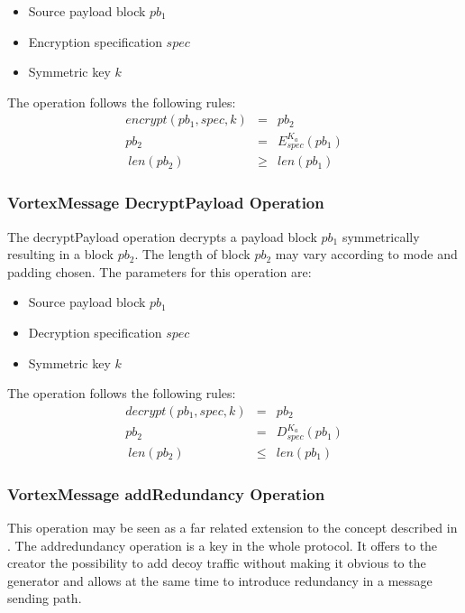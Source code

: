 \begin{itemize}
	\item Source payload block $pb_1$
	\item Encryption specification $spec$
	\item Symmetric key $k$
\end{itemize}

The operation follows the following rules:
\begin{eqnarray}
encrypt(pb_1, spec, k) & = & pb_2 \\
pb_2 & = & E_{spec}^{K_a}\left( pb_1 \right)\\\
len(pb_2) & \geq & len(pb_1)
\end{eqnarray}

\subsubsection{VortexMessage DecryptPayload Operation}
The decryptPayload operation decrypts a payload block $pb_1$ symmetrically resulting in a block $pb_2$. The length of block $pb_2$ may vary according to mode and padding chosen. The parameters for this operation are:

\begin{itemize}
	\item Source payload block $pb_1$
	\item Decryption specification $spec$
	\item Symmetric key $k$
\end{itemize}

The operation follows the following rules:
\begin{eqnarray}
decrypt(pb_1, spec, k) & = & pb_2 \\
pb_2 & = & D_{spec}^{K_a}\left( pb_1 \right)\\\
len(pb_2) & \leq & len(pb_1)
\end{eqnarray}

\subsubsection{VortexMessage addRedundancy Operation}
This operation may be seen as a far related extension to the concept described in \cite{chaum1988multiparty}. The addredundancy operation is a key in the whole protocol. It offers to the creator the possibility to add decoy traffic without making it obvious to the generator and allows at the same time to introduce redundancy in a message sending path. 

